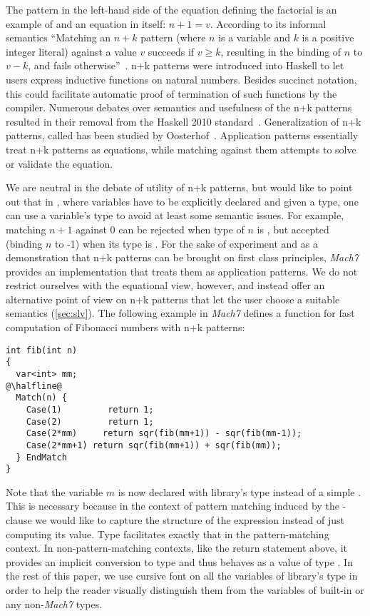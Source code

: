 \noindent
The  pattern in the left-hand side of the equation defining 
the factorial is an example of  and an equation in itself: 
$n+1=v$. According to its informal semantics ``Matching an $n+k$ pattern (where 
$n$ is a variable and $k$ is a positive integer literal) against a value $v$ 
succeeds if $v \ge k$, resulting in the binding of $n$ to $v-k$, and fails 
otherwise''~\cite{haskell98}. n+k patterns were introduced into Haskell to let 
users express inductive functions on natural numbers. Besides succinct notation, 
this could facilitate automatic proof of termination of such functions by the 
compiler. Numerous debates over semantics and usefulness of the n+k patterns 
resulted in their removal from the Haskell 2010 standard~\cite{haskell2010}. 
Generalization of n+k patterns, called  has been 
studied by Oosterhof~\cite{OosterhofThesis}. Application patterns essentially 
treat n+k patterns as equations, while matching against them attempts to solve 
or validate the equation.

We are neutral in the debate of utility of n+k patterns, but would like to point 
out that in \Cpp{}, where variables have to be explicitly declared and given a 
type, one can use a variable's type to avoid at least some semantic issues. For 
example, matching $n+1$ against 0 can be rejected when type of $n$ is 
, but accepted (binding $n$ to -1) when its type is 
. For the sake of experiment and as a demonstration that n+k patterns 
can be brought on first class principles, \emph{Mach7} provides an 
implementation that treats them as application patterns. We do not restrict 
ourselves with the equational view, however, and instead offer an alternative 
point of view on n+k patterns that let the user choose a suitable semantics 
(\textsection\ref{sec:slv}). The following example in \emph{Mach7} defines a 
function for fast computation of Fibonacci numbers with n+k patterns:

\begin{lstlisting}[keepspaces]
int fib(int n)
{
  var<int> mm;
@\halfline@
  Match(n) {
    Case(1)         return 1;     
    Case(2)         return 1;
    Case(2*mm)     return sqr(fib(mm+1)) - sqr(fib(mm-1));
    Case(2*mm+1) return sqr(fib(mm+1)) + sqr(fib(mm));
  } EndMatch
}
\end{lstlisting}

\noindent
Note that the variable $m$ is now declared with library's type  
instead of a simple . This is necessary because in the context of 
pattern matching induced by the -clause we would like to capture the 
structure of the expression  instead of just computing its value. 
Type  facilitates exactly that in the pattern-matching context. In 
non-pattern-matching contexts, like the return statement above, it provides an 
implicit conversion to type  and thus behaves as a value of type . 
In the rest of this paper, we use cursive font on all the variables of 
library's type in order to help the reader visually distinguish them from the 
variables of built-in or any non-\emph{Mach7} types.


